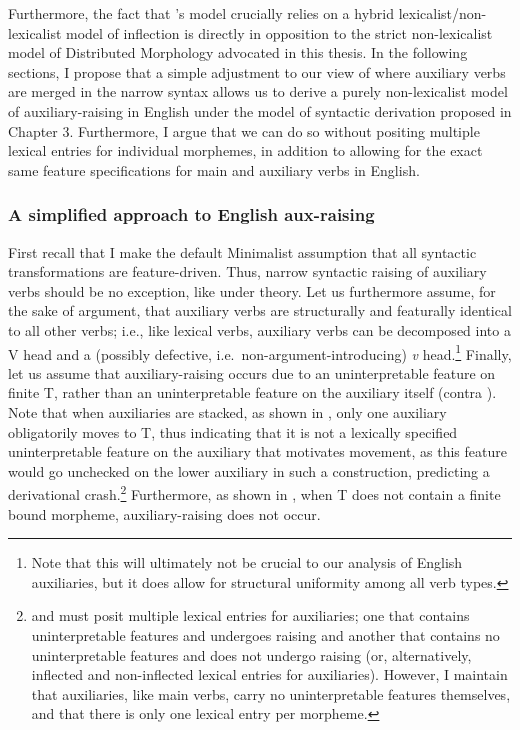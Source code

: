 Furthermore, the fact that \citeauthor{lasnik1995}'s model crucially relies on a hybrid lexicalist/non-lexicalist model of inflection is directly in opposition to the strict non-lexicalist model of Distributed Morphology advocated in this thesis. In the following sections, I propose that a simple adjustment to our view of where auxiliary verbs are merged in the narrow syntax allows us to derive a purely non-lexicalist model of auxiliary-raising in English under the model of syntactic derivation proposed in Chapter 3. Furthermore, I argue that we can do so without positing multiple lexical entries for individual morphemes, in addition to allowing for the exact same feature specifications for main and auxiliary verbs in English.

\subsubsection{A simplified approach to English aux-raising}
First recall that I make the default Minimalist assumption that all syntactic transformations are feature-driven. Thus, narrow syntactic raising of auxiliary verbs should be no exception, like under  theory. Let us furthermore assume, for the sake of argument, that auxiliary verbs are structurally and featurally identical to all other verbs; i.e., like lexical verbs, auxiliary verbs can be decomposed into a V head and a (possibly defective, i.e.\ non-argument-introducing) {\it v} head.\footnote{Note that this will ultimately not be crucial to our analysis of English auxiliaries, but it does allow for structural uniformity among all verb types.} Finally, let us assume that auxiliary-raising occurs due to an uninterpretable feature on finite T, rather than an uninterpretable feature on the auxiliary itself (contra ). Note that when auxiliaries are stacked, as shown in \Next[a], only one auxiliary obligatorily moves to T, thus indicating that it is not a lexically specified uninterpretable feature on the auxiliary that motivates movement, as this feature would go unchecked on the lower auxiliary in such a construction, predicting a derivational crash.\footnote{\citet{lasnik1995} and \citet{omaki2008} must posit multiple lexical entries for auxiliaries; one that contains uninterpretable features and undergoes raising and another that contains no uninterpretable features and does not undergo raising (or, alternatively, inflected and non-inflected lexical entries for auxiliaries). However, I maintain that auxiliaries, like main verbs, carry no uninterpretable features themselves, and that there is only one lexical entry per morpheme.} Furthermore, as shown in \Next[b], when T does not contain a finite bound morpheme, auxiliary-raising does not occur.

